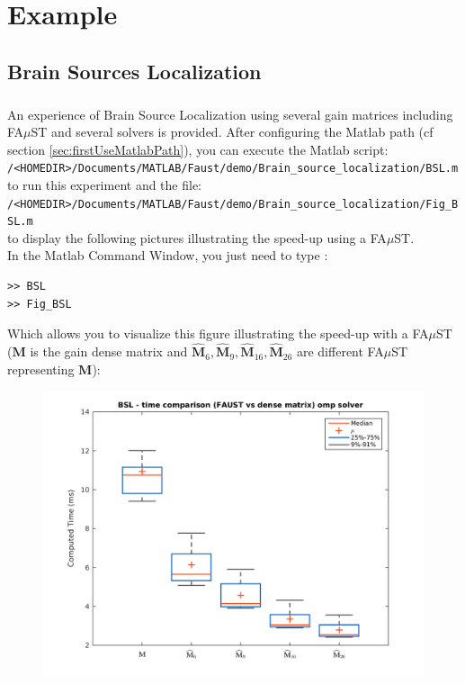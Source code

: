 \chapter{Example}\label{sec:example}

\section{Brain Sources Localization}\label{sec:BSL_example}
%



\paragraph{} An experience of Brain Source Localization using several gain matrices including FA$\mu$ST and several solvers is provided. After configuring the Matlab path (cf section \ref{sec:firstUseMatlabPath}), you can execute the Matlab script: \\
\texttt{/<HOMEDIR>/Documents/MATLAB/Faust/demo/Brain\_source\_localization/BSL.m}\\
to run this experiment and the file:\\
\texttt{/<HOMEDIR>/Documents/MATLAB/Faust/demo/Brain\_source\_localization/Fig\_BSL.m} \\
to display the following pictures illustrating the speed-up using a FA$\mu$ST.\\
In the Matlab Command Window, you just need to type :
\begin{lstlisting}
>> BSL
>> Fig_BSL
\end{lstlisting}

Which allows you to visualize this figure illustrating the speed-up with a FA$\mu$ST ($\mathbf{M}$ is the gain dense matrix and $\widehat{\mathbf{M}}_{6},\widehat{\mathbf{M}}_{9},\widehat{\mathbf{M}}_{16},\widehat{\mathbf{M}}_{26}$ are different FA$\mu$ST representing  $\mathbf{M}$):

\begin{figure}[!htbp]
\label{fig:BSL}
\includegraphics[scale=0.7]{images/BSL.png}
\end{figure}
